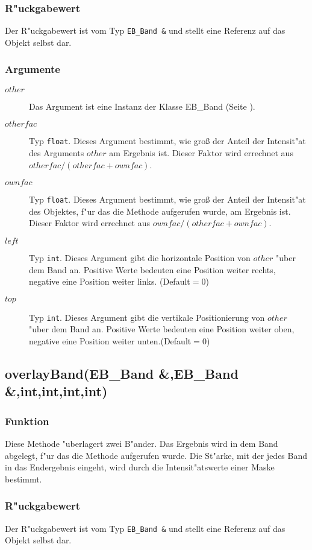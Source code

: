\documentclass[12pt,a4paper,draft,twoside,onecolumn,titlepage]{book}
\newcommand{\pref}[1]{(Seite \pageref{#1})}
\newcommand{\carg}[1]{$ #1 $}
\newcommand{\ctyp}[1]{{\tt #1}}
\newcommand{\class}[1]{{\sc #1}}
\newcommand{\arglist}[1]{\footnotesize{#1}}
\begin{document}
\subsubsection{R"uckgabewert}
Der R"uckgabewert ist vom Typ \ctyp{EB\_Band \&} und stellt eine Referenz auf das Objekt selbst dar. 
\subsubsection{Argumente}
\begin{description}
\item[\carg{other}]{Das Argument ist eine Instanz der Klasse \class{EB\_Band} \pref{classebband}.}
\item[\carg{otherfac}]{Typ \ctyp{float}. Dieses Argument bestimmt, wie gro{\ss} der Anteil der Intensit"at des Arguments \carg{other} am Ergebnis ist. Dieser Faktor wird errechnet aus $otherfac/(otherfac+ownfac)$.}
\item[\carg{ownfac}]{Typ \ctyp{float}. Dieses Argument bestimmt, wie gro{\ss} der Anteil der Intensit"at des Objektes, f"ur das die Methode aufgerufen wurde, am Ergebnis ist. Dieser Faktor wird errechnet aus $ownfac/(otherfac+ownfac)$.}
\item[\carg{left}]{Typ \ctyp{int}. Dieses Argument gibt die horizontale Position von \carg{other} "uber dem Band an. Positive Werte bedeuten eine Position weiter rechts, negative eine Position weiter links. (Default$=0$)}
\item[\carg{top}]{Typ \ctyp{int}. Dieses Argument gibt die vertikale Positionierung von \carg{other} "uber dem Band an. Positive Werte bedeuten eine Position weiter oben, negative eine Position weiter unten.(Default$=0$)}
\end{description}
\subsection{overlayBand\arglist{(EB\_Band \&,EB\_Band \&,int,int,int,int)}}
\subsubsection{Funktion}
Diese Methode "uberlagert zwei B"ander. Das Ergebnis wird in dem Band abgelegt, f"ur das die Methode aufgerufen wurde. Die St"arke, mit der jedes Band in das Endergebnis eingeht, wird durch die Intensit"atswerte einer Maske bestimmt.
\subsubsection{R"uckgabewert}
Der R"uckgabewert ist vom Typ \ctyp{EB\_Band \&} und stellt eine Referenz auf das Objekt selbst dar. 
\end{document}
